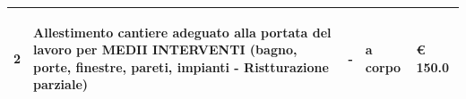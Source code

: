 \documentclass[a4paper]{article}
\begin{document}
\begin{tabular}{ | L{10mm} |  L{86mm} | L{12mm} | L{12mm} | L{16mm} | }
                            
                              \vspace{2.5mm}
                              \begin{spacing}{0}
                           2
                              \end{spacing} &
                              \vspace{2.5mm}
                              \begin{spacing}{0}
                           Allestimento cantiere adeguato alla portata del lavoro per MEDII INTERVENTI (bagno, porte, finestre, pareti, impianti - Ristturazione parziale)
                              \end{spacing} &
                              \vspace{2.5mm}
                              \begin{spacing}{0}
                           -
                              \end{spacing} &
                              \vspace{2.5mm}
                              \begin{spacing}{0}
                           a corpo
                              \end{spacing} &
                              \vspace{2.5mm}
                              \begin{spacing}{0}
                                \euro\hfill 
                            150.0
                              \end{spacing} \\
                              \hline
            

\end{tabular}
\end{document}

